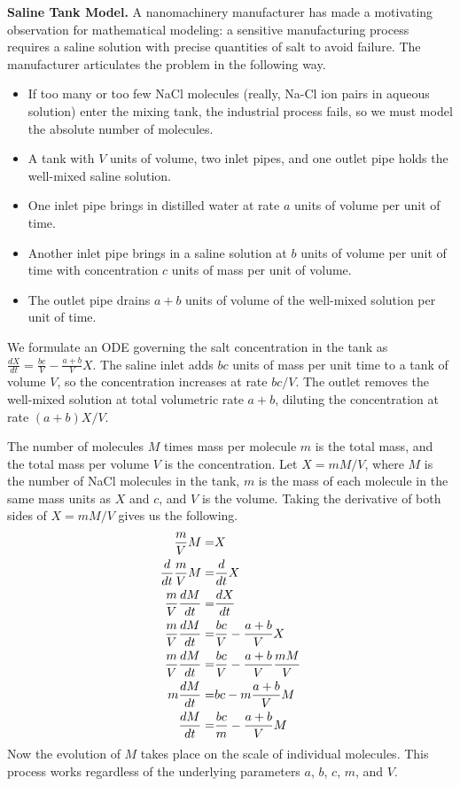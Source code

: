 \begin{example}\label{ex:saline_tank}
\textbf{Saline Tank Model.} A nanomachinery manufacturer has made a motivating observation for mathematical modeling: a sensitive manufacturing process requires a saline solution with precise quantities of salt to avoid failure. The manufacturer articulates the problem in the following way.
\begin{itemize}
\item If too many or too few NaCl molecules (really, Na-Cl ion pairs in aqueous solution) enter the mixing tank, the industrial process fails, so we must model the absolute number of molecules.
\item A tank with $V$ units of volume, two inlet pipes, and one outlet pipe holds the well-mixed saline solution.
\item One inlet pipe brings in distilled water at rate $a$ units of volume per unit of time.
\item Another inlet pipe brings in a saline solution at $b$ units of volume per unit of time with concentration $c$ units of mass per unit of volume.
\item The outlet pipe drains $a+b$ units of volume of the well-mixed solution per unit of time.
\end{itemize}

We formulate an ODE governing the salt concentration in the tank as $\frac{dX}{dt} = \frac{bc}{V} - \frac{a+b}{V}X$. The saline inlet adds $bc$ units of mass per unit time to a tank of volume $V$, so the concentration increases at rate $bc/V$. The outlet removes the well-mixed solution at total volumetric rate $a+b$, diluting the concentration at rate $(a+b)X/V$.

The number of molecules $M$ times mass per molecule $m$ is the total mass, and the total mass per volume $V$ is the concentration. Let $X = mM/V$, where $M$ is the number of NaCl molecules in the tank, $m$ is the mass of each molecule in the same mass units as $X$ and $c$, and $V$ is the volume. Taking the derivative of both sides of $X = mM/V$ gives us the following.
\begin{align}
\frac{m}{V}M =& X \notag \\
\frac{d}{dt} \frac{m}{V}M =& \frac{d}{dt} X \notag \\
\frac{m}{V} \frac{dM}{dt} =& \frac{dX}{dt} \notag \\
\frac{m}{V} \frac{dM}{dt} =& \frac{bc}{V} - \frac{a+b}{V}X \notag \\
\frac{m}{V} \frac{dM}{dt} =& \frac{bc}{V} - \frac{a+b}{V} \frac{mM}{V} \notag \\
m \frac{dM}{dt} =& bc - m\frac{a+b}{V}M \notag \\
\frac{dM}{dt} =& \frac{bc}{m} - \frac{a+b}{V}M \label{eqn:saline_tank}
\end{align} Now the evolution of $M$ takes place on the scale of individual molecules. This process works regardless of the underlying parameters $a$, $b$, $c$, $m$, and $V$.

\end{example}

